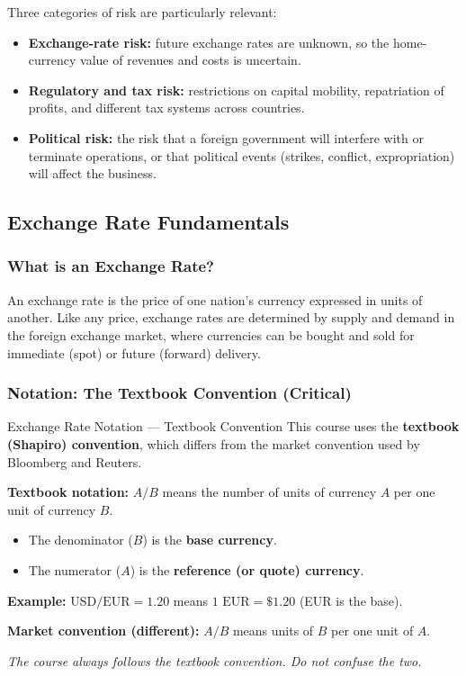 \documentclass[11pt,a4paper]{article}
\begin{document}
Three categories of risk are particularly relevant:
\begin{itemize}
  \item \textbf{Exchange-rate risk:} future exchange rates are unknown, so the home-currency value of revenues and costs is uncertain.
  \item \textbf{Regulatory and tax risk:} restrictions on capital mobility, repatriation of profits, and different tax systems across countries.
  \item \textbf{Political risk:} the risk that a foreign government will interfere with or terminate operations, or that political events (strikes, conflict, expropriation) will affect the business.
\end{itemize}

\subsection{Exchange Rate Fundamentals}

\subsubsection{What is an Exchange Rate?}

An exchange rate is the price of one nation's currency expressed in units of another. Like any price, exchange rates are determined by supply and demand in the foreign exchange market, where currencies can be bought and sold for immediate (spot) or future (forward) delivery.

\subsubsection{Notation: The Textbook Convention (Critical)}

\begin{conceptbox}{Exchange Rate Notation --- Textbook Convention}
This course uses the \textbf{textbook (Shapiro) convention}, which differs from the market convention used by Bloomberg and Reuters.

\textbf{Textbook notation:} $A/B$ means the number of units of currency $A$ per one unit of currency $B$.
\begin{itemize}
  \item The denominator ($B$) is the \textbf{base currency}.
  \item The numerator ($A$) is the \textbf{reference (or quote) currency}.
\end{itemize}

\textbf{Example:} $\text{USD}/\text{EUR} = 1.20$ means $1 \text{ EUR} = \$1.20$ (EUR is the base).

\textbf{Market convention (different):} $A/B$ means units of $B$ per one unit of $A$.

\textit{The course always follows the textbook convention. Do not confuse the two.}
\end{conceptbox}
\end{document}
